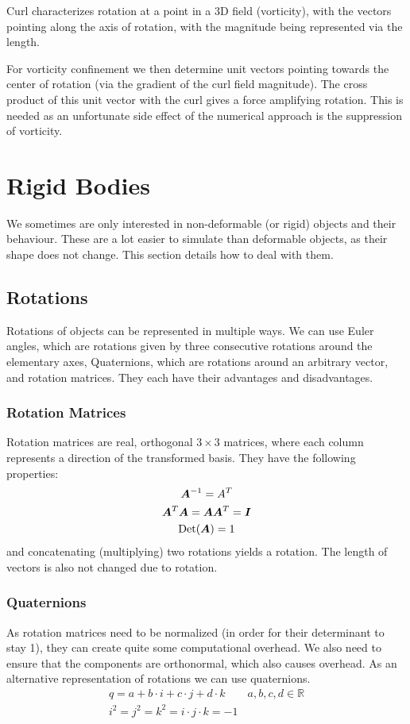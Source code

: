 \documentclass{article}
\begin{document}
Curl characterizes rotation at a point in a 3D field (vorticity), with the vectors pointing along the axis of rotation, with the magnitude being represented via the length.

For vorticity confinement we then determine unit vectors pointing towards the center of rotation (via the gradient of the curl field magnitude).
The cross product of this unit vector with the curl gives a force amplifying rotation.
This is needed as an unfortunate side effect of the numerical approach is the suppression of vorticity.

\section{Rigid Bodies}
We sometimes are only interested in non-deformable (or rigid) objects and their behaviour.
These are a lot easier to simulate than deformable objects, as their shape does not change.
This section details how to deal with them.

\subsection{Rotations}
Rotations of objects can be represented in multiple ways.
We can use Euler angles, which are rotations given by three consecutive rotations around the elementary axes, Quaternions, which are rotations around an arbitrary vector, and rotation matrices.
They each have their advantages and disadvantages.

\subsubsection{Rotation Matrices}
Rotation matrices are real, orthogonal $3\times3$ matrices, where each column represents a direction of the transformed basis.
They have the following properties:
\begin{gather}
    \bm{A}^{-1} = A^T\\
    \bm{A}^T\bm{A} = \bm{AA}^T = \bm{I}\\
    \textup{Det}(\bm{A}) = 1
\end{gather}
and concatenating (multiplying) two rotations yields a rotation.
The length of vectors is also not changed due to rotation.

\subsubsection{Quaternions}
As rotation matrices need to be normalized (in order for their determinant to stay 1), they can create quite some computational overhead.
We also need to ensure that the components are orthonormal, which also causes overhead.
As an alternative representation of rotations we can use quaternions.
\begin{gather}
    q = a + b \cdot i + c \cdot j + d \cdot k \qquad a,b,c,d \in \mathbb{R}\\
    i^2 = j^2 = k^2 = i \cdot j \cdot k = -1
\end{gather}
\end{document}
